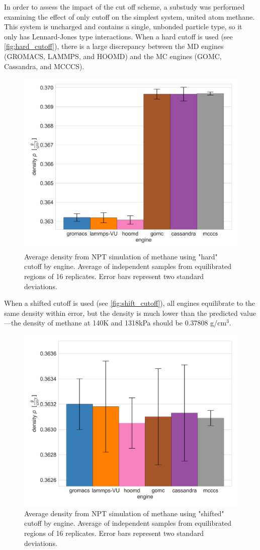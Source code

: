 In order to assess the impact of the cut off scheme, a substudy was performed examining the effect of only cutoff on the simplest system, united atom methane. This system is uncharged and contains a single, unbonded particle type, so it only has Lennard-Jones type interactions. When a hard cutoff is used (see \autoref{fig:hard_cutoff}), there is a large discrepancy between the MD engines (GROMACS, LAMMPS, and HOOMD) and the MC engines (GOMC, Cassandra, and MCCCS). 
\begin{figure}[h!]
    \centering
    \includegraphics[width=0.8\linewidth,keepaspectratio]{figures/rep_study/hard_cutoff.png}
    \caption{Average density from NPT simulation of methane using "hard" cutoff by engine. Average of independent samples from equilibrated regions of 16 replicates. Error bars represent two standard deviations.}\label{fig:hard_cutoff}
\end{figure}
When a shifted cutoff is used (see \autoref{fig:shift_cutoff}), all engines equilibrate to the same density within error, but the density is much lower than the predicted value---the density of methane at 140K and 1318kPa should be 0.37808 g/cm$^3$\cite{NISTwebbook}.
\begin{figure}[h!]
    \centering
    \includegraphics[width=0.8\linewidth,keepaspectratio]{figures/rep_study/shift_cutoff.png}
    \caption{Average density from NPT simulation of methane using "shifted" cutoff by engine. Average of independent samples from equilibrated regions of 16 replicates. Error bars represent two standard deviations.}\label{fig:shift_cutoff}
\end{figure}
